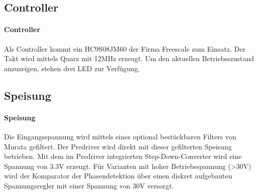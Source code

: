 \ifSTANDALONE
\subsection{Controller}
\fi
\ifEMBED
\paragraph{Controller}$~~$\vspace{2mm}\\
\fi
Als Controller kommt ein HC9S08JM60 der Firma Freescale zum Einsatz. Der Takt 
wird mittels Quarz mit 12\si{\mega\hertz} erzeugt. Um den aktuellen Betriebsszustand 
anzuzeigen, stehen drei LED zur Verfügung. 

\ifSTANDALONE
\subsection{Speisung}
\fi
\ifEMBED
\paragraph{Speisung}$~~$\vspace{2mm}\\
\fi
Die Eingangsspannung wird mittels eines optional bestückbaren Filters von 
Murata gefiltert. Der Predriver wird direkt mit dieser gefilterten Speisung 
betrieben. Mit dem im Predriver integrierten Step-Down-Converter wird eine 
Spannung von 3.3\si{\volt} erzeugt. Für Varianten mit hoher Betriebsspannung (>30\si{\volt}) 
wird der Komparator der Phasendetektion über einen diskret aufgebauten 
Spannungsregler mit einer Spannung von 30\si{\volt} versorgt. 

